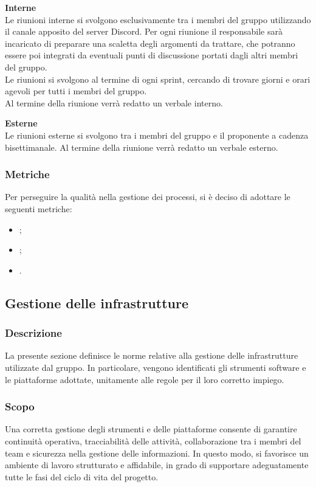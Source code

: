 \noindent \textbf{Interne} \\
    Le riunioni interne si svolgono esclusivamente tra i membri del gruppo
    utilizzando il canale apposito del server Discord. Per ogni riunione il
    responsabile sarà incaricato di preparare una scaletta degli argomenti da
    trattare, che potranno essere poi integrati da eventuali punti di discussione
    portati dagli altri membri del gruppo.\\ Le riunioni si svolgono al termine di ogni sprint, cercando di trovare giorni e orari agevoli per tutti i membri del
    gruppo. \\Al termine della riunione verrà redatto un verbale interno.
    \vspace{1em}

    \noindent \textbf{Esterne} \\
    Le riunioni esterne si svolgono tra i membri del gruppo e il proponente a
    cadenza bisettimanale. Al termine della riunione verrà redatto un verbale
    esterno.

    \subsubsection{Metriche}
    Per perseguire la qualità nella gestione dei processi, si è deciso
    di adottare le seguenti metriche:
    \begin{itemize}
        \item {};
        \item {};
        \item {}.
    \end{itemize}

    \subsection{Gestione delle infrastrutture}
    \subsubsection{Descrizione}
    La presente sezione definisce le norme relative alla gestione delle infrastrutture utilizzate dal gruppo. 
    In particolare, vengono identificati gli strumenti software e le piattaforme adottate, unitamente alle regole per il loro corretto impiego.
    
    \subsubsection{Scopo}
     Una corretta gestione degli strumenti e delle piattaforme consente di garantire 
     continuità operativa, tracciabilità delle attività, collaborazione tra i membri 
     del team e sicurezza nella gestione delle informazioni. In questo modo, 
     si favorisce un ambiente di lavoro strutturato e affidabile, in grado di 
     supportare adeguatamente tutte le fasi del ciclo di vita del progetto.

